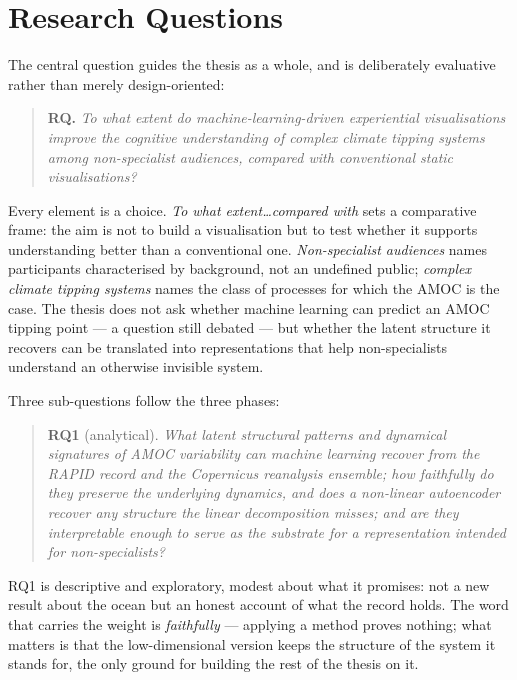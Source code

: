 \section{Research Questions}
\label{sec:rqs}

The central question guides the thesis as a whole, and is deliberately evaluative rather than merely design-oriented:

\begin{quote}
\textbf{RQ.} \emph{To what extent do machine-learning-driven experiential visualisations improve the cognitive understanding of complex climate tipping systems among non-specialist audiences, compared with conventional static visualisations?}
\end{quote}

Every element is a choice. \emph{To what extent\ldots compared with} sets a comparative frame: the aim is not to build a visualisation but to test whether it supports understanding better than a conventional one. \emph{Non-specialist audiences} names participants characterised by background, not an undefined public; \emph{complex climate tipping systems} names the class of processes for which the AMOC is the case. The thesis does not ask whether machine learning can predict an AMOC tipping point --- a question still debated \citep{benyami2024, ditlevsen2023} --- but whether the latent structure it recovers can be translated into representations that help non-specialists understand an otherwise invisible system.

Three sub-questions follow the three phases:

\begin{quote}
\textbf{RQ1} (analytical). \emph{What latent structural patterns and dynamical signatures of AMOC variability can machine learning recover from the RAPID record and the Copernicus reanalysis ensemble; how faithfully do they preserve the underlying dynamics, and does a non-linear autoencoder recover any structure the linear decomposition misses; and are they interpretable enough to serve as the substrate for a representation intended for non-specialists?}
\end{quote}

RQ1 is descriptive and exploratory, modest about what it promises: not a new result about the ocean but an honest account of what the record holds. The word that carries the weight is \emph{faithfully} --- applying a method proves nothing; what matters is that the low-dimensional version keeps the structure of the system it stands for, the only ground for building the rest of the thesis on it.

